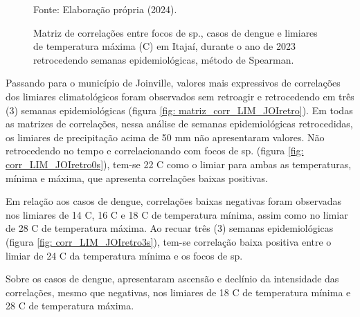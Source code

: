 \begin{figure}[htbp]
    \begin{center}
    \caption{Matriz de correlações entre focos de  sp., casos de dengue e limiares de temperatura máxima (C) em Itajaí, durante o ano de 2023 retrocedendo semanas epidemiológicas, método de Spearman.}
    \label{fig: matriz_corr_LIMtmax_ITA}
        \hfill
    \end{center}
    \small{Fonte: Elaboração própria (2024).}
\end{figure}


\indent Passando para o município de Joinville, valores mais expressivos de correlações dos limiares climatológicos foram observados sem retroagir e retrocedendo em três (3) semanas epidemiológicas (figura \ref{fig: matriz_corr_LIM_JOIretro}). Em todas as matrizes de correlações, nessa análise de semanas epidemiológicas retrocedidas, os limiares de precipitação acima de 50 mm não apresentaram valores. Não retrocedendo no tempo e correlacionando com focos de  sp. (figura \ref{fig: corr_LIM_JOIretro0s}), tem-se 22 C como o limiar para ambas as temperaturas, mínima e máxima, que apresenta correlações baixas positivas.

\indent Em relação aos casos de dengue, correlações baixas negativas foram observadas nos limiares de 14 C, 16 C e 18 C de temperatura mínima, assim como no limiar de 28 C de temperatura máxima. Ao recuar três (3) semanas epidemiológicas (figura \ref{fig: corr_LIM_JOIretro3s}), tem-se correlação baixa positiva entre o limiar de 24 C da temperatura mínima e os focos de  sp.

\indent Sobre os casos de dengue, apresentaram ascensão e declínio da intensidade das correlações, mesmo que negativas, nos limiares de 18 C de temperatura mínima e 28 C de temperatura máxima. 


